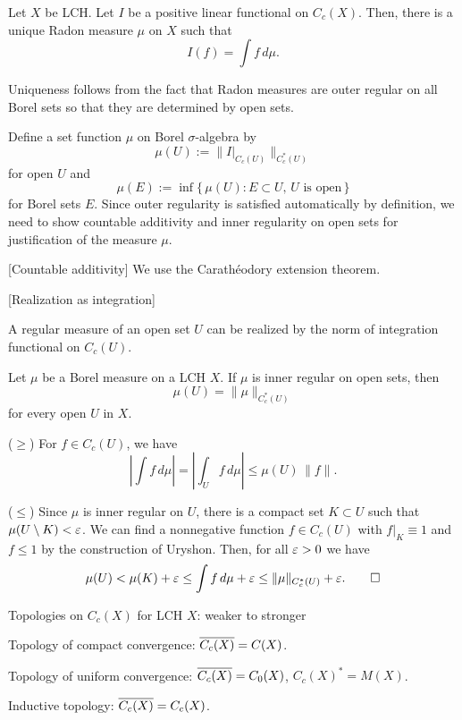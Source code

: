 \documentclass{../exp}
\begin{document}
\begin{thm}
Let $X$ be LCH.
Let $I$ be a positive linear functional on $C_c(X)$.
Then, there is a unique Radon measure $\mu$ on $X$ such that
\[I(f)=\int f\,d\mu.\]
\end{thm}
\begin{pf}
Uniqueness follows from the fact that Radon measures are outer regular on all Borel sets so that they are determined by open sets.

Define a set function $\mu$ on Borel $\sigma$-algebra by
\[\mu(U):=\|I|_{C_c(U)}\|_{C_c^*(U)}\]
for open $U$ and
\[\mu(E):=\inf\{\,\mu(U):E\subset U,\,U\text{ is open}\,\}\]
for Borel sets $E$.
Since outer regularity is satisfied automatically by definition, we need to show countable additivity and inner regularity on open sets for justification of the measure $\mu$.

[Countable additivity]
We use the Carath\'eodory extension theorem.

[Realization as integration]

\end{pf}


A regular measure of an open set $U$ can be realized by the norm of integration functional on $C_c(U)$.
\begin{lem}
Let $\mu$ be a Borel measure on a LCH $X$.
If $\mu$ is inner regular on open sets, then
\[\mu(U)=\|\mu\|_{C_c^*(U)}\]
for every open $U$ in $X$.
\end{lem}
\begin{pf}
($\ge$)
For $f\in C_c(U)$, we have
\[|\int f\,d\mu|=|\int_Uf\,d\mu|\le\mu(U)\,\|f\|.\]

($\le$)
Since $\mu$ is inner regular on $U$, there is a compact set $K\subset U$ such that $\mu(U\setminus K)<\varepsilon$.
We can find a nonnegative function $f\in C_c(U)$ with $f|_K \equiv 1$ and $f\le1$ by the construction of Uryshon.
Then, for all $\varepsilon>0$ we have
\[\mu(U)<\mu(K)+\varepsilon\le\int f\,d\mu+\varepsilon\le\|\mu\|_{C_c^*(U)}+\varepsilon.\qedhere\]
\end{pf}


Topologies on $C_c(X)$ for LCH $X$: weaker to stronger
\begin{cond}
\item Topology of compact convergence: $\overline{C_c(X)}=C(X)$.
\item Topology of uniform convergence: $\overline{C_c(X)}=C_0(X)$, $C_c(X)^*=M(X)$.
\item Inductive topology: $\overline{C_c(X)}=C_c(X)$.
\end{cond}
\end{document}
